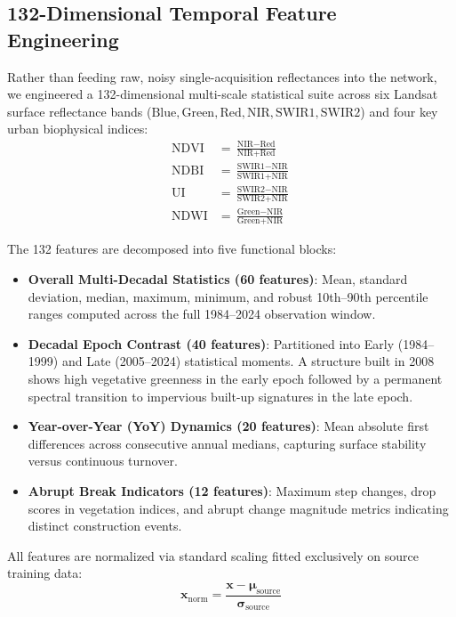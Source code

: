 \documentclass[11pt,a4paper]{article}
\begin{document}
\subsection{132-Dimensional Temporal Feature Engineering}
Rather than feeding raw, noisy single-acquisition reflectances into the network, we engineered a 132-dimensional multi-scale statistical suite across six Landsat surface reflectance bands ($\text{Blue}, \text{Green}, \text{Red}, \text{NIR}, \text{SWIR1}, \text{SWIR2}$) and four key urban biophysical indices:
\begin{align}
    \text{NDVI} &= \frac{\text{NIR} - \text{Red}}{\text{NIR} + \text{Red}} \\
    \text{NDBI} &= \frac{\text{SWIR1} - \text{NIR}}{\text{SWIR1} + \text{NIR}} \\
    \text{UI} &= \frac{\text{SWIR2} - \text{NIR}}{\text{SWIR2} + \text{NIR}} \\
    \text{NDWI} &= \frac{\text{Green} - \text{NIR}}{\text{Green} + \text{NIR}}
\end{align}

The 132 features are decomposed into five functional blocks:
\begin{itemize}
    \item \textbf{Overall Multi-Decadal Statistics (60 features)}: Mean, standard deviation, median, maximum, minimum, and robust 10th--90th percentile ranges computed across the full 1984--2024 observation window.
    \item \textbf{Decadal Epoch Contrast (40 features)}: Partitioned into Early (1984--1999) and Late (2005--2024) statistical moments. A structure built in 2008 shows high vegetative greenness in the early epoch followed by a permanent spectral transition to impervious built-up signatures in the late epoch.
    \item \textbf{Year-over-Year (YoY) Dynamics (20 features)}: Mean absolute first differences across consecutive annual medians, capturing surface stability versus continuous turnover.
    \item \textbf{Abrupt Break Indicators (12 features)}: Maximum step changes, drop scores in vegetation indices, and abrupt change magnitude metrics indicating distinct construction events.
\end{itemize}

All features are normalized via standard scaling fitted exclusively on source training data:
\begin{equation}
    \mathbf{x}_{\text{norm}} = \frac{\mathbf{x} - \boldsymbol{\mu}_{\text{source}}}{\boldsymbol{\sigma}_{\text{source}}}
\end{equation}
\end{document}
